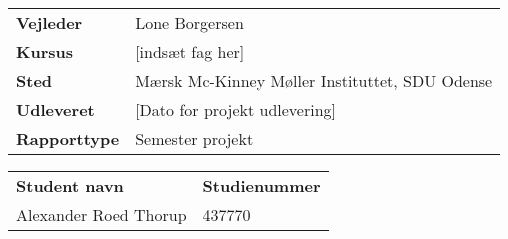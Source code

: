 \maketitle

\begin{table}[H]
    \centering
    \begin{tabular}{l l}
        \textbf{Vejleder} &  Lone Borgersen \\
        \textbf{Kursus} & [indsæt fag her] \\
        \textbf{Sted} & Mærsk Mc-Kinney Møller Instituttet, SDU Odense \\
        \textbf{Udleveret} & [Dato for projekt udlevering] \\
        \textbf{Rapporttype} & Semester projekt
    \end{tabular}
\end{table}

\begin{table}[H]
    \centering
    \begin{tabular}{l l}
        \textbf{Student navn} & \textbf{Studienummer} \\
        Alexander Roed Thorup & 437770
    \end{tabular}
\end{table}

\newpage